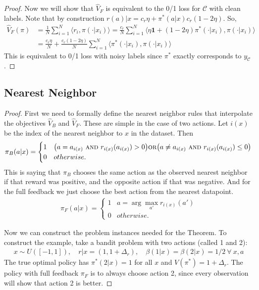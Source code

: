 \begin{subappendices}
\begin{proof}
Now we will show that $ \hat V_F$ is equivalent to the 0/1 loss for $ \mathcal{C}$ with clean labels. Note that by construction $ r(a)|x = c_r \eta + \pi^*(a|x)c_r (1 - 2 \eta)$. So,
\begin{align}
    \hat V_F(\pi) &= \frac{1}{N} \sum_{i=1}^N \langle r_i, \pi(\cdot|x_i)\rangle = \frac{c_r}{N} \sum_{i=1}^N \langle \eta \textbf{1} + (1 - 2\eta) \pi^*(\cdot|x_i), \pi(\cdot|x_i)\rangle \\
    &= \frac{c_r \eta}{N} +  \frac{c_r (1 - 2\eta)}{N} \sum_{i=1}^N \langle  \pi^*(\cdot|x_i), \pi(\cdot|x_i)\rangle
\end{align}
This is equivalent to 0/1 loss with noisy labels since $ \pi^*$ exactly corresponds to $ y_\mathcal{C}$.
\end{proof}





\subsection{Nearest Neighbor}

\nn*

\begin{proof}
First we need to formally define the nearest neighbor rules that interpolate the objectives $ \hat V_B$ and $ \hat V_F$. These are simple in the case of two actions. Let $ i(x)$ be the index of the nearest neighbor to $ x$ in the dataset. Then
\begin{align}
    \pi_B(a|x) = \begin{cases}1 & \big(a = a_{i(x)} \ \textsc{and}\  r_{i(x)}(a_{i(x)}) > 0\big) \textsc{or} \big(a \neq a_{i(x)} \ \textsc{and}\  r_{i(x)}(a_{i(x)}) \leq 0\big) \\ 0 & otherwise.\end{cases}
\end{align}
This is saying that $ \pi_B$ chooses the same action as the observed nearest neighbor if that reward was positive, and the opposite action if that was negative.
And for the full feedback we just choose the best action from the nearest datapoint.
\begin{align}
    \pi_F(a|x) = \begin{cases}1 & a = \arg\max_{a'} r_{i(x)}(a')\\ 0 & otherwise. \end{cases}
\end{align}

Now we can construct the problem instances needed for the Theorem.
To construct the example, take a bandit problem with two actions (called 1 and 2):
\begin{align*}
    x \sim U([-1,1]), \quad r|x = (1, 1 + \Delta_r), \quad \beta(1|x) = \beta(2|x) = 1/2 \ \forall\ x,a
\end{align*}
The true optimal policy has $\pi^*(2|x) = 1$ for all $x$ and $ V(\pi^*) = 1+\Delta_r$.
The policy with full feedback $ \pi_F $ is to always choose action 2, since every observation will show that action 2 is better.



\end{proof}
\end{subappendices}
